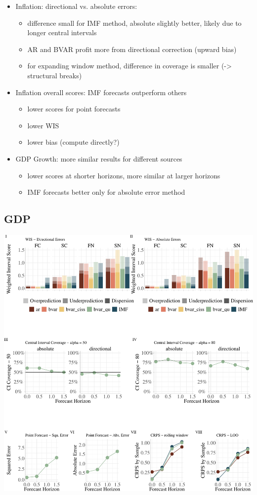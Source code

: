 \documentclass[
]{article}
\begin{document}
\begin{itemize}
\item Inflation: directional vs. absolute errors:
\begin{itemize}
\item difference small for IMF method, absolute slightly better, likely due to longer central intervals
\item AR and BVAR profit more from directional correction (upward bias)
\item for expanding window method, difference in coverage is smaller (-> structural breaks)

\end{itemize}
\item Inflation overall scores: IMF forecasts outperform others
\begin{itemize}
\item lower scores for point forecasts
\item lower WIS 
\item lower bias (compute directly?)
\end{itemize}


\item GDP Growth: more similar results for different sources
\begin{itemize}
\item lower scores at shorter horizons, more similar at larger horizons
\item IMF forecasts better only for absolute error method
\end{itemize}
\end{itemize}

\newpage

\hypertarget{gdp}{%
\subsection{GDP}\label{gdp}}

\includegraphics{manuscript_files/figure-latex/gdpovr_rw-1.pdf}
\end{document}
